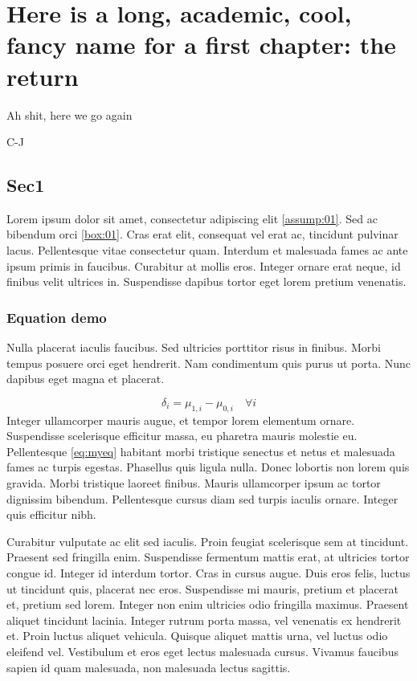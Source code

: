 \documentclass[./main.tex]{subfiles}
\begin{document}
\chapter{Here is a long, academic, cool, fancy name for a first chapter: the return} \label{chap:01}

\epigraph{Ah shit, here we go again}{C-J}

\section{Sec1} \label{sec:intro}

\par Lorem ipsum dolor sit amet, consectetur adipiscing elit \ref{assump:01}. Sed ac bibendum orci \ref{box:01}. Cras erat elit, consequat vel erat ac, tincidunt pulvinar lacus. Pellentesque vitae consectetur quam. Interdum et malesuada fames ac ante ipsum primis in faucibus. Curabitur at mollis eros. Integer ornare erat neque, id finibus velit ultrices in. Suspendisse dapibus tortor eget lorem pretium venenatis. 

\subsection{Equation demo} \label{sec:intro:1}

\par Nulla placerat iaculis faucibus. Sed ultricies porttitor risus in finibus. Morbi tempus posuere orci eget hendrerit. Nam condimentum quis purus ut porta. Nunc dapibus eget magna et placerat.

\begin{equation} %
		\label{eq:myeq}
		\delta_{i} = \mu_{1, i} - \mu_{0, i} \quad \forall i 
\end{equation}
Integer ullamcorper mauris augue, et tempor lorem elementum ornare. Suspendisse scelerisque efficitur massa, eu pharetra mauris molestie eu. Pellentesque \eqref{eq:myeq} habitant morbi tristique senectus et netus et malesuada fames ac turpis egestas. Phasellus quis ligula nulla. Donec lobortis non lorem quis gravida. Morbi tristique laoreet finibus. Mauris ullamcorper ipsum ac tortor dignissim bibendum. Pellentesque cursus diam sed turpis iaculis ornare. Integer quis efficitur nibh.


\par Curabitur vulputate ac elit sed iaculis. Proin feugiat scelerisque sem at tincidunt. Praesent sed fringilla enim. Suspendisse fermentum mattis erat, at ultricies tortor congue id. Integer id interdum tortor. Cras in cursus augue. Duis eros felis, luctus ut tincidunt quis, placerat nec eros. Suspendisse mi mauris, pretium et placerat et, pretium sed lorem. Integer non enim ultricies odio fringilla maximus. Praesent aliquet tincidunt lacinia. Integer rutrum porta massa, vel venenatis ex hendrerit et. Proin luctus aliquet vehicula. Quisque aliquet mattis urna, vel luctus odio eleifend vel. Vestibulum et eros eget lectus malesuada cursus. Vivamus faucibus sapien id quam malesuada, non malesuada lectus sagittis. 
\end{document}
